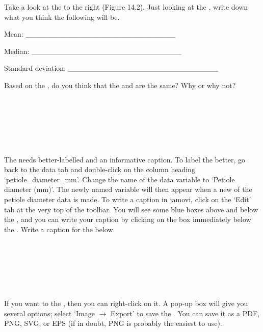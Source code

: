 \documentclass[
  openany]{krantz}
\begin{document}
Take a look at the  to the right (Figure 14.2).
Just looking at the , write down what you think the following  will be.

\newpage

Mean: \_\_\_\_\_\_\_\_\_\_\_\_\_\_\_\_\_\_\_\_\_\_\_\_\_\_\_\_

Median: \_\_\_\_\_\_\_\_\_\_\_\_\_\_\_\_\_\_\_\_\_\_\_\_\_\_\_\_

Standard deviation: \_\_\_\_\_\_\_\_\_\_\_\_\_\_\_\_\_\_\_\_\_\_\_\_\_\_\_\_

Based on the , do you think that the  and  are the same? Why or why not?

\begin{verbatim}






\end{verbatim}

The  needs better-labelled  and an informative caption.
To label the  better, go back to the data tab and double-click on the column heading `petiole\_diameter\_mm'.
Change the name of the data variable to `Petiole diameter (mm)'.
The newly named variable will then appear when a new  of the petiole diameter data is made.
To write a caption in jamovi, click on the `Edit' tab at the very top of the toolbar.
You will see some blue boxes above and below the , and you can write your caption by clicking on the box immediately below the .
Write a caption for the  below.

\begin{verbatim}






\end{verbatim}

If you want to  the , then you can right-click on it.
A pop-up box will give you several options; select `Image \(\to\) Export' to save the .
You can save it as a PDF, PNG, SVG, or EPS (if in doubt, PNG is probably the easiest to use).
\end{document}
